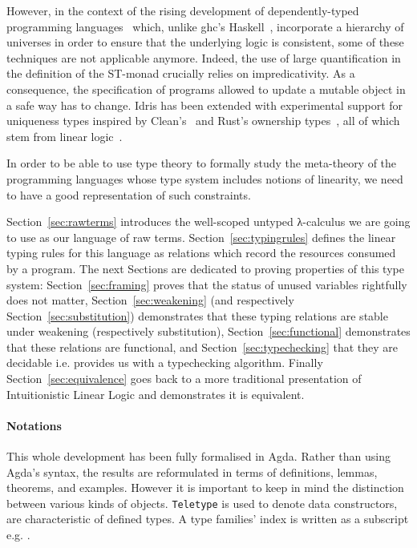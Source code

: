 However, in the context of the rising development of dependently-typed
programming languages~\cite{Brady2013idris, norell2009dependently} which,
unlike ghc's Haskell~\cite{weirich2013towards}, incorporate a hierarchy
of universes in order to ensure that the underlying logic is consistent,
some of these techniques are not applicable anymore. Indeed, the use of
large quantification in the definition of the ST-monad crucially relies
on impredicativity. As a consequence, the specification of programs
allowed to update a mutable object in a safe way has to change.
Idris has been extended with experimental support for uniqueness types
inspired by Clean's~\cite{achten1993high} and Rust's ownership types~\cite{manual:rust},
all of which stem from linear logic~\cite{girard1987linear}.

In order to be able to use type theory to formally study the meta-theory
of the programming languages whose type system includes notions of linearity,
we need to have a good representation of such constraints.

Section~\ref{sec:rawterms} introduces the well-scoped untyped λ-calculus
we are going to use as our language of raw terms. Section~\ref{sec:typingrules}
defines the linear typing rules for this language as relations which
record the resources consumed by a program. The next Sections are dedicated
to proving properties of this type system: Section~\ref{sec:framing}
proves that the status of unused variables rightfully does not matter,
Section~\ref{sec:weakening} (and respectively Section~\ref{sec:substitution})
demonstrates that these typing relations are stable under weakening
(respectively substitution), Section~\ref{sec:functional} demonstrates that
these relations are functional, and Section~\ref{sec:typechecking} that
they are decidable i.e. provides us with a typechecking algorithm. Finally
Section~\ref{sec:equivalence} goes back to a more traditional presentation
of Intuitionistic Linear Logic and demonstrates it is equivalent.


\paragraph*{Notations} This whole development has been fully formalised
in Agda. Rather than using Agda's syntax, the results are reformulated
in terms of definitions, lemmas, theorems, and examples. However it is
important to keep in mind the distinction between various kinds of objects.
\texttt{Teletype} is used to denote data constructors,  are characteristic of defined types. A type families' index is
written as a subscript e.g. .


